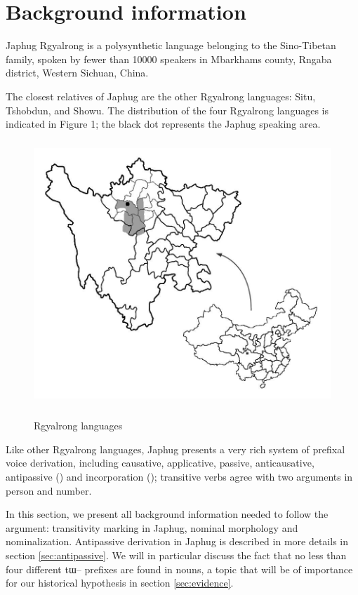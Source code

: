 \documentclass[oldfontcommands,oneside,a4paper,11pt]{article}
\newcommand{\ipa}[1]{{\phon \mbox{#1}}} %
\begin{document}
 

\section{Background information}
Japhug Rgyalrong is a polysynthetic language belonging to the Sino-Tibetan family, spoken by fewer than 10000 speakers in Mbarkhams county, Rngaba district, Western Sichuan, China.

The closest relatives of Japhug are the other Rgyalrong languages: Situ, Tshobdun, and Showu. The distribution of the four Rgyalrong languages is indicated in Figure 1; the black dot represents the Japhug speaking area.
\begin{figure}[h]
\centering \label{figure:map1}
\includegraphics[height=100mm]{carte.JPG}
\caption{Rgyalrong languages}
\label{fig:rgyalrong}
\end{figure}
 

Like other Rgyalrong languages, Japhug presents a very rich system of prefixal voice derivation, including causative, applicative, passive, anticausative, antipassive (\citealt{jacques12demotion}) and incorporation (\citealt{jacques12incorp}); transitive verbs agree with two arguments in person and number.

In this section, we present all background information needed to follow the argument: transitivity marking in Japhug, nominal morphology and nominalization. Antipassive derivation in Japhug is described in more details in section \ref{sec:antipassive}. We will in particular discuss the fact that no less than four different  \ipa{tɯ--} prefixes are found in nouns, a topic that will be of importance for our historical hypothesis in section \ref{sec:evidence}.
 
\end{document}
